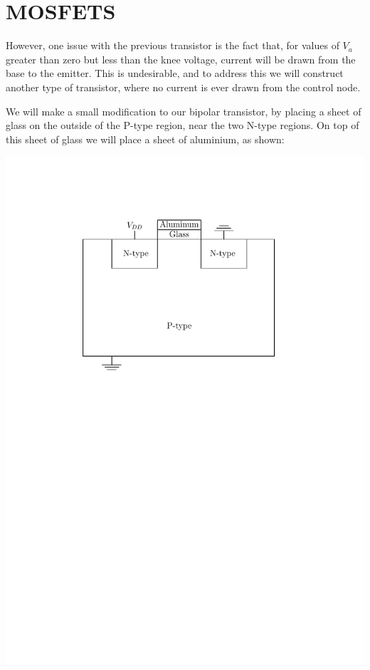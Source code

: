 \documentclass[letterpaper]{article}
\theoremstyle{remark}
\begin{document}
\section{MOSFETS}
However, one issue with the previous transistor is the fact that, for values of $V_a$ greater than zero but less than the knee voltage, current will be drawn from the base to the emitter. This is undesirable, and to address this we will construct another type of transistor, where no current is ever drawn from the control node.

We will make a small modification to our bipolar transistor, by placing a sheet of glass on the outside of the P-type region, near the two N-type regions. On top of this sheet of glass we will place a sheet of aluminium, as shown:
\begin{center}
    \includegraphics[scale=0.7]{mosfet.pdf}
\end{center}
\end{document}
